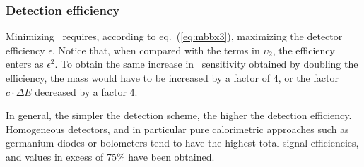 
\subsubsection{Detection efficiency} \label{subsec:efficiency}

Minimizing \mbb\ requires, according to eq.~(\ref{eq:mbbx3}), maximizing the detector efficiency $\epsilon$. Notice that, when compared with the terms in $\upsilon_2$, 
the efficiency enters as $\epsilon^2$. 
To obtain the same increase in \mbb\ sensitivity obtained by doubling the efficiency, the mass would have to be increased by a factor of 4, or the factor
$c\cdot \Delta E$ decreased by a factor 4. 

In general, the simpler the detection scheme, the higher the detection efficiency. Homogeneous detectors, 
and in particular 
pure calorimetric approaches such as germanium diodes or bolometers tend to have the highest total signal efficiencies, and values in excess of 75\% have been obtained. 
%

